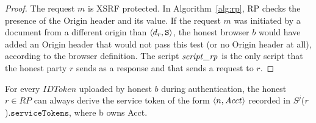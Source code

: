   \begin{proof}
    The request $m$ is XSRF protected. In Algorithm~\ref{alg:rp}, 
    RP checks the presence of the Origin header and its value. 
    If the request $m$ was initiated by a document from a 
    different origin than $\langle d_r, \mathtt{S}\rangle$, the honest browser 
    $b$ would have added an Origin header that would not 
    pass this test (or no Origin header at all), according to 
    the browser definition. The script $\mathit{script\_rp}$ is the 
    only script that the honest party $r$ sends as a response 
    and that sends a request to $r$.
  \end{proof}
  
  \begin{lemma}
    For every $IDToken$ uploaded by honest $b$ during authentication, 
    the honest $r \in RP$ can always derive the service token of the form 
    $\langle {{}n, \mathit{Acct}} \rangle$ recorded in $S^j$($r$).$\mathtt{serviceTokens}$, where b owns Acct. 
  \end{lemma}
